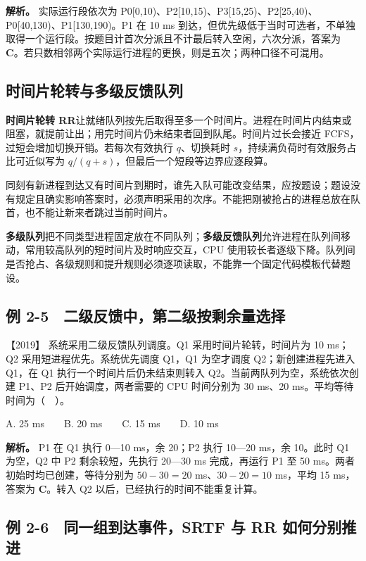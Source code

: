 \textbf{解析。} 实际运行段依次为 P0{[}0,10)、P2{[}10,15)、P3{[}15,25)、P2{[}25,40)、P0{[}40,130)、P1{[}130,190)。P1 在 10 ms 到达，但优先级低于当时可选者，不单独取得一个运行段。按题目计首次分派且不计最后转入空闲，六次分派，答案为 \textbf{C}。若只数相邻两个实际运行进程的更换，则是五次；两种口径不可混用。

\subsection{时间片轮转与多级反馈队列}\label{os-c02-h165}

\textbf{时间片轮转 RR}让就绪队列按先后取得至多一个时间片。进程在时间片内结束或阻塞，就提前让出；用完时间片仍未结束者回到队尾。时间片过长会接近 FCFS，过短会增加切换开销。若每次有效执行 \(q\)、切换耗时 \(s\)，持续满负荷时有效服务占比可近似写为 \(q/(q+s)\)，但最后一个短段等边界应逐段算。

同刻有新进程到达又有时间片到期时，谁先入队可能改变结果，应按题设；题设没有规定且确实影响答案时，必须声明采用的次序。不能把刚被抢占的进程总放在队首，也不能让新来者跳过当前时间片。

\textbf{多级队列}把不同类型进程固定放在不同队列；\textbf{多级反馈队列}允许进程在队列间移动，常用较高队列的短时间片及时响应交互，CPU 使用较长者逐级下降。队列间是否抢占、各级规则和提升规则必须逐项读取，不能靠一个固定代码模板代替题设。

\subsection{例 2-5　二级反馈中，第二级按剩余量选择}\label{os-ex2-5}

\noindent{}【2019】 系统采用二级反馈队列调度。Q1 采用时间片轮转，时间片为 10 ms；Q2 采用短进程优先。系统优先调度 Q1，Q1 为空才调度 Q2；新创建进程先进入 Q1，在 Q1 执行一个时间片后仍未结束则转入 Q2。当前两队列为空，系统依次创建 P1、P2 后开始调度，两者需要的 CPU 时间分别为 30 ms、20 ms。平均等待时间为（　）。

A. 25 ms　　B. 20 ms　　C. 15 ms　　D. 10 ms


\textbf{解析。} P1 在 Q1 执行 0---10 ms，余 20；P2 执行 10---20 ms，余 10。此时 Q1 为空，Q2 中 P2 剩余较短，先执行 20---30 ms 完成，再运行 P1 至 50 ms。两者初始时均已创建，等待分别为 \(50-30=20\) ms、\(30-20=10\) ms，平均 15 ms，答案为 \textbf{C}。转入 Q2 以后，已经执行的时间不能重复计算。

\subsection{例 2-6　同一组到达事件，SRTF 与 RR 如何分别推进}\label{os-ex2-6}

